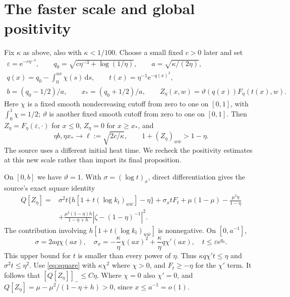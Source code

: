 \documentclass[11pt]{article}
\theoremstyle{remark}
\newcommand{\negpart}[1]{[#1]_-}
\begin{document}
\section{The faster scale and global positivity}
Fix $\kappa$ as above, also with $\kappa<1/100$. Choose a small fixed $c>0$
later and set
\begin{gather*}
 \varepsilon=\mathrm e^{-c\eta^{-3}},\qquad
 q_0=\sqrt{c\eta^{-3}+\log(1/\eta)},\qquad
 a=\sqrt{\kappa/(2\eta)},\\
 q(x)=q_0-\int_0^{ax}\chi(s)\,\mathrm ds,\qquad
 t(x)=\eta^{-1}\mathrm e^{-q(x)^2},\\
 b=(q_0-1/2)/a,\qquad x_*=(q_0+1/2)/a,\qquad
 Z_\eta(x,w)=\vartheta(q(x))F_\eta(t(x),w).
\end{gather*}
Here $\chi$ is a fixed smooth nondecreasing cutoff from zero to one on
$[0,1]$, with $\int_0^1\chi=1/2$; $\vartheta$ is another fixed smooth cutoff
from zero to one on $[0,1]$. Then $Z_\eta=F_\eta(\varepsilon,\cdot)$ for
$x\leq0$, $Z_\eta=0$ for $x\geq x_*$, and
\[
 \eta b,\eta x_*\longrightarrow\ell:=\sqrt{2c/\kappa},\qquad
 1+(Z_\eta)_{w\bar w}>1-\eta.
\]
The source uses a different initial heat time. We recheck the positivity
estimates at this new scale rather than import its final proposition.

On $[0,b]$ we have $\vartheta=1$.
With $\sigma=(\log t)_x$, direct differentiation gives the source's exact
square identity
\begin{equation}\label{eq:identity}
\begin{split}
 Q[Z_\eta]={}&\sigma^2t\{h[1+t(\log k_t)_{w\bar w}]-\eta\}
       +\sigma_xtF_t+\mu(1-\mu)-\frac{\mu^2\eta}{1-\eta}\\
 &+\frac{\mu^2(1-\eta)h}{1-\eta+h}
             |\zeta-(1-\eta)^{-1}|^2.
\end{split}
\end{equation}
The contribution involving $h[1+t(\log k_t)_{w\bar w}]$ is nonnegative.
On $[0,a^{-1}]$,
\[
 \sigma=2aq\chi(ax),\quad
 \sigma_x=-\frac\kappa\eta\chi(ax)^2+\frac\kappa\eta q\chi'(ax),
 \quad t\leq\varepsilon\mathrm e^{q_0}.
\]
This upper bound for $t$ is smaller than every power of $\eta$.
Thus $\kappa q\chi't\leq\eta$ and $\sigma^2t\leq\eta^2$.
Use \eqref{eq:square} with $\kappa\chi^2$ where $\chi>0$, and $F_t\geq-\eta$
for the $\chi'$ term. It follows that $\negpart{Q[Z_\eta]}\leq C\eta$.
Where $\chi=0$ also $\chi'=0$, and
$Q[Z_\eta]=\mu-\mu^2/(1-\eta+h)>0$, since $x\leq a^{-1}=o(1)$.
\end{document}
